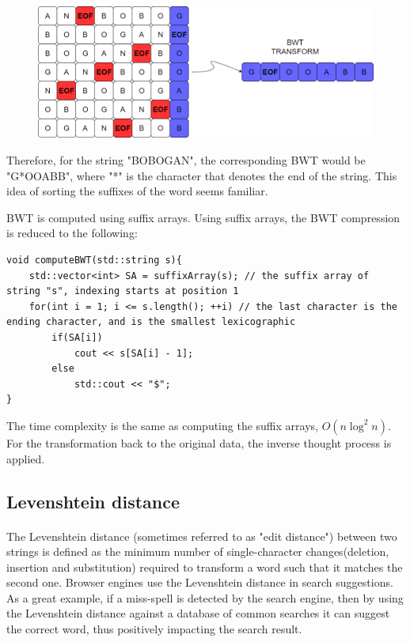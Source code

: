 \documentclass[letterpaper]{article}
\begin{document}
\begin{figure} [h!]
\centering
\includegraphics[width=1\textwidth]{pngOfDiagrams/bwtfinal.png}
\end{figure}

Therefore, for the string "BOBOGAN", the corresponding BWT would be "G*OOABB", where "*" is the character that denotes the end of the string. This idea of sorting the suffixes of the word seems familiar.

BWT is computed using suffix arrays. Using suffix arrays, the BWT compression is reduced to the following:

\begin{lstlisting}
void computeBWT(std::string s){
    std::vector<int> SA = suffixArray(s); // the suffix array of string "s", indexing starts at position 1
    for(int i = 1; i <= s.length(); ++i) // the last character is the ending character, and is the smallest lexicographic
        if(SA[i])
            cout << s[SA[i] - 1];
        else 
            std::cout << "$";
}
\end{lstlisting}

The time complexity is the same as computing the suffix arrays, $O(n \log ^ 2 n)$. For the transformation back to the original data, the inverse thought process is applied.


\newpage

\subsection{Levenshtein distance}

\paragraph{}

The Levenshtein distance (sometimes referred to  as "edit distance") between two strings is defined as the minimum number of single-character changes(deletion, insertion and substitution) required to transform a word such that it matches the second one. Browser engines use the Levenshtein distance in search suggestions. As a great example, if a miss-spell is detected by the search engine, then by using the Levenshtein distance against a database of common searches it can suggest the correct word, thus positively impacting the search result. 
\end{document}
